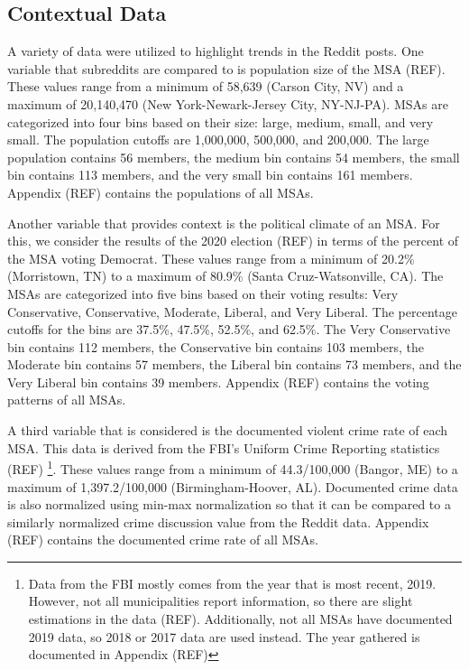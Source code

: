 \documentclass[12pt,oneside, letterpaper]{book}
\begin{document}
\subsection{Contextual Data}
\par A variety of data were utilized to highlight trends in the Reddit posts. One variable that subreddits are compared to is population size of the MSA (REF). These values range from a minimum of 58,639 (Carson City, NV) and a maximum of 20,140,470 (New York-Newark-Jersey City, NY-NJ-PA). MSAs are categorized into four bins based on their size: large, medium, small, and very small. The population cutoffs are 1,000,000, 500,000, and 200,000. The large population contains 56 members, the medium bin contains 54 members, the small bin contains 113 members, and the very small bin contains 161 members. Appendix (REF) contains the populations of all MSAs.

\par Another variable that provides context is the political climate of an MSA. For this, we consider the results of the 2020 election (REF) in terms of the percent of the MSA voting Democrat. These values range from a minimum of 20.2\% (Morristown, TN) to a maximum of 80.9\% (Santa Cruz-Watsonville, CA). The MSAs are categorized into five bins based on their voting results: Very Conservative, Conservative, Moderate, Liberal, and Very Liberal. The percentage cutoffs for the bins are 37.5\%, 47.5\%, 52.5\%, and 62.5\%. The Very Conservative bin contains 112 members, the Conservative bin contains 103 members, the Moderate bin contains 57 members, the Liberal bin contains 73 members, and the Very Liberal bin contains 39 members. Appendix (REF) contains the voting patterns of all MSAs.

\par A third variable that is considered is the documented violent crime rate of each MSA. This data is derived from the FBI's Uniform Crime Reporting statistics (REF) \footnote{Data from the FBI mostly comes from the year that is most recent, 2019. However, not all municipalities report information, so there are slight estimations in the data (REF). Additionally, not all MSAs have documented 2019 data, so 2018 or 2017 data are used instead. The year gathered is documented in Appendix (REF)}. These values range from a minimum of 44.3/100,000 (Bangor, ME) to a maximum of 1,397.2/100,000 (Birmingham-Hoover, AL). Documented crime data is also normalized using min-max normalization so that it can be compared to a similarly normalized crime discussion value from the Reddit data. Appendix (REF) contains the documented crime rate of all MSAs.
\end{document}
